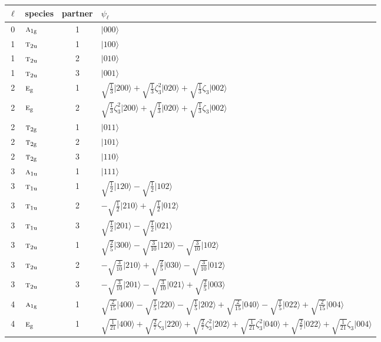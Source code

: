 \documentclass[11pt]{article}
\newcommand{\irr}[1]{\text{\normalfont\scshape #1}}
\newcommand{\ptag}[1]{\mathrm{#1}}
\newcommand{\rootunity}[1]{\zeta_{#1}}
\newcommand{\occ}[1]{\lvert #1\rangle}
\begin{document}
\begin{longtable}{c l c p{}}\hline $\ell$ & species & partner & $\psi_\ell$\\ \hline\endhead
0 & $\irr{a}_{1\ptag{g}}$ & 1 & $\occ{000}$\\
\hline
1 & $\irr{t}_{2\ptag{u}}$ & 1 & $\occ{100}$\\
1 & $\irr{t}_{2\ptag{u}}$ & 2 & $\occ{010}$\\
1 & $\irr{t}_{2\ptag{u}}$ & 3 & $\occ{001}$\\
\hline
2 & $\irr{e}_{\ptag{g}}$ & 1 & $\sqrt{\tfrac{1}{3}}\occ{200}+\sqrt{\tfrac{1}{3}}\rootunity{3}^{2}\occ{020}+\sqrt{\tfrac{1}{3}}\rootunity{3}\occ{002}$\\
2 & $\irr{e}_{\ptag{g}}$ & 2 & $\sqrt{\tfrac{1}{3}}\rootunity{3}^{2}\occ{200}+\sqrt{\tfrac{1}{3}}\occ{020}+\sqrt{\tfrac{1}{3}}\rootunity{3}\occ{002}$\\
2 & $\irr{t}_{2\ptag{g}}$ & 1 & $\occ{011}$\\
2 & $\irr{t}_{2\ptag{g}}$ & 2 & $\occ{101}$\\
2 & $\irr{t}_{2\ptag{g}}$ & 3 & $\occ{110}$\\
\hline
3 & $\irr{a}_{1\ptag{u}}$ & 1 & $\occ{111}$\\
3 & $\irr{t}_{1\ptag{u}}$ & 1 & $\sqrt{\tfrac{1}{2}}\occ{120}-\sqrt{\tfrac{1}{2}}\occ{102}$\\
3 & $\irr{t}_{1\ptag{u}}$ & 2 & $-\sqrt{\tfrac{1}{2}}\occ{210}+\sqrt{\tfrac{1}{2}}\occ{012}$\\
3 & $\irr{t}_{1\ptag{u}}$ & 3 & $\sqrt{\tfrac{1}{2}}\occ{201}-\sqrt{\tfrac{1}{2}}\occ{021}$\\
3 & $\irr{t}_{2\ptag{u}}$ & 1 & $\sqrt{\tfrac{2}{5}}\occ{300}-\sqrt{\tfrac{3}{10}}\occ{120}-\sqrt{\tfrac{3}{10}}\occ{102}$\\
3 & $\irr{t}_{2\ptag{u}}$ & 2 & $-\sqrt{\tfrac{3}{10}}\occ{210}+\sqrt{\tfrac{2}{5}}\occ{030}-\sqrt{\tfrac{3}{10}}\occ{012}$\\
3 & $\irr{t}_{2\ptag{u}}$ & 3 & $-\sqrt{\tfrac{3}{10}}\occ{201}-\sqrt{\tfrac{3}{10}}\occ{021}+\sqrt{\tfrac{2}{5}}\occ{003}$\\
\hline
4 & $\irr{a}_{1\ptag{g}}$ & 1 & $\sqrt{\tfrac{2}{15}}\occ{400}-\sqrt{\tfrac{1}{5}}\occ{220}-\sqrt{\tfrac{1}{5}}\occ{202}+\sqrt{\tfrac{2}{15}}\occ{040}-\sqrt{\tfrac{1}{5}}\occ{022}+\sqrt{\tfrac{2}{15}}\occ{004}$\\
4 & $\irr{e}_{\ptag{g}}$ & 1 & $\sqrt{\tfrac{1}{21}}\occ{400}+\sqrt{\tfrac{2}{7}}\rootunity{3}\occ{220}+\sqrt{\tfrac{2}{7}}\rootunity{3}^{2}\occ{202}+\sqrt{\tfrac{1}{21}}\rootunity{3}^{2}\occ{040}+\sqrt{\tfrac{2}{7}}\occ{022}+\sqrt{\tfrac{1}{21}}\rootunity{3}\occ{004}$\\

\end{longtable}
\end{document}
